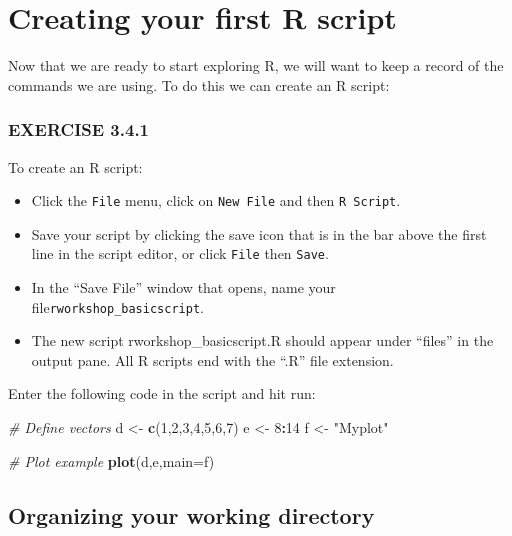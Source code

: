\documentclass[
]{book}
\newenvironment{Shaded}{\begin{snugshade}}{\end{snugshade}}
\newcommand{\AttributeTok}[1]{\textcolor[rgb]{0.13,0.29,0.53}{#1}}
\newcommand{\CommentTok}[1]{\textcolor[rgb]{0.56,0.35,0.01}{\textit{#1}}}
\newcommand{\DecValTok}[1]{\textcolor[rgb]{0.00,0.00,0.81}{#1}}
\newcommand{\FunctionTok}[1]{\textcolor[rgb]{0.13,0.29,0.53}{\textbf{#1}}}
\newcommand{\NormalTok}[1]{#1}
\newcommand{\OtherTok}[1]{\textcolor[rgb]{0.56,0.35,0.01}{#1}}
\newcommand{\SpecialCharTok}[1]{\textcolor[rgb]{0.81,0.36,0.00}{\textbf{#1}}}
\newcommand{\StringTok}[1]{\textcolor[rgb]{0.31,0.60,0.02}{#1}}
\providecommand{\tightlist}{%
  \setlength{\itemsep}{0pt}\setlength{\parskip}{0pt}}
\begin{document}
\section{Creating your first R script}\label{creating-your-first-r-script}

Now that we are ready to start exploring R, we will want to keep a record of the commands we are using. To do this we can create an R script:

\subsubsection*{EXERCISE 3.4.1}\label{exercise-3.4.1}

To create an R script:

\begin{itemize}
\tightlist
\item
  Click the \texttt{File} menu, click on \texttt{New\ File} and then \texttt{R\ Script}.
\item
  Save your script by clicking the save icon that is in the bar above the first line in the script editor, or click \texttt{File} then \texttt{Save}.
\item
  In the ``Save File'' window that opens, name your file\texttt{rworkshop\_basicscript}.
\item
  The new script rworkshop\_basicscript.R should appear under ``files'' in the output pane. All R scripts end with the ``.R'' file extension.
\end{itemize}

Enter the following code in the script and hit run:

\begin{Shaded}
\begin{Highlighting}[]
\CommentTok{\# Define vectors}
\NormalTok{d }\OtherTok{\textless{}{-}} \FunctionTok{c}\NormalTok{(}\DecValTok{1}\NormalTok{,}\DecValTok{2}\NormalTok{,}\DecValTok{3}\NormalTok{,}\DecValTok{4}\NormalTok{,}\DecValTok{5}\NormalTok{,}\DecValTok{6}\NormalTok{,}\DecValTok{7}\NormalTok{)}
\NormalTok{e }\OtherTok{\textless{}{-}} \DecValTok{8}\SpecialCharTok{:}\DecValTok{14}
\NormalTok{f }\OtherTok{\textless{}{-}} \StringTok{"Myplot"}

\CommentTok{\# Plot example}
\FunctionTok{plot}\NormalTok{(d,e,}\AttributeTok{main=}\NormalTok{f)}
\end{Highlighting}
\end{Shaded}

\subsection*{Organizing your working directory}\label{organizing-your-working-directory}
\end{document}
